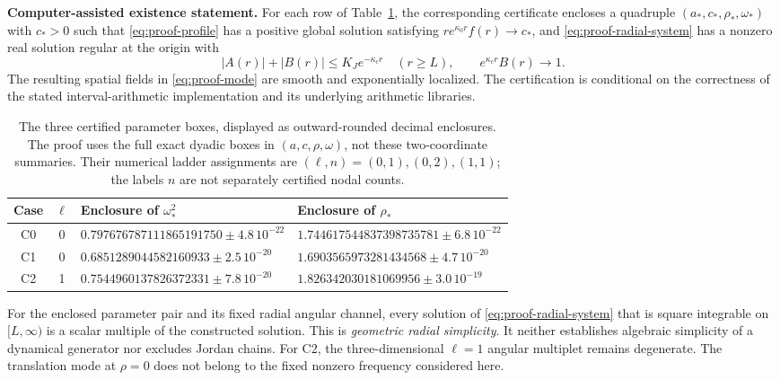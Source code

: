 \noindent\textbf{Computer-assisted existence statement.}
For each row of Table~\ref{tab:proof-cases}, the corresponding certificate
encloses a quadruple $(a_*,c_*,\rho_*,\omega_*)$ with $c_*>0$ such that
\eqref{eq:proof-profile} has a positive global solution satisfying
$r e^{\kappa_0r}f(r)\to c_*$, and
\eqref{eq:proof-radial-system} has a nonzero real solution regular at the
origin with
\begin{equation}
 |A(r)|+|B(r)|\leq K_J e^{-\kappa_c r}\quad(r\geq L),
 \qquad e^{\kappa_c r}B(r)\longrightarrow1.
 \label{eq:proof-decay}
\end{equation}
The resulting spatial fields in \eqref{eq:proof-mode} are smooth and
exponentially localized. The certification is
conditional on the correctness of the stated interval-arithmetic
implementation and its underlying arithmetic libraries.

\begin{table}[htbp]
\centering
\small
\begin{tabular}{ccll}
\hline
Case & $\ell$ & Enclosure of $\omega_*^2$ & Enclosure of $\rho_*$ \\
\hline
C0 & 0 & $0.797676787111865191750\pm4.8\,10^{-22}$
       & $1.744617544837398735781\pm6.8\,10^{-22}$ \\
C1 & 0 & $0.6851289044582160933\pm2.5\,10^{-20}$
       & $1.6903565973281434568\pm4.7\,10^{-20}$ \\
C2 & 1 & $0.7544960137826372331\pm7.8\,10^{-20}$
       & $1.826342030181069956\pm3.0\,10^{-19}$ \\
\hline
\end{tabular}
\caption{The three certified parameter boxes, displayed as outward-rounded
decimal enclosures. The proof uses the full exact dyadic boxes in
$(a,c,\rho,\omega)$, not these two-coordinate summaries.
Their numerical ladder
assignments are $(\ell,n)=(0,1),(0,2),(1,1)$; the labels $n$ are not
separately certified nodal counts.}
\label{tab:proof-cases}
\end{table}

For the enclosed parameter pair and its fixed radial angular channel, every
solution of \eqref{eq:proof-radial-system} that is square integrable on
$[L,\infty)$ is a scalar multiple of the constructed solution. This is
\emph{geometric radial simplicity}. It neither establishes algebraic
simplicity of a dynamical generator nor excludes Jordan chains. For C2,
the three-dimensional $\ell=1$ angular multiplet remains degenerate.
The translation mode at $\rho=0$ does not belong to the fixed nonzero
frequency considered here.

